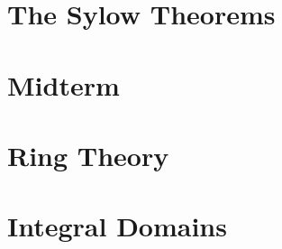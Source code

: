 \documentclass{bookneue}
\begin{document}
\vfill\pagebreak



\vfill\pagebreak

\chapter{The Sylow Theorems}



\vfill\pagebreak



\vfill\pagebreak



\vfill\pagebreak



\vfill\pagebreak



\vfill\pagebreak

\chapter{Midterm}



\vfill\pagebreak



\chapter{Ring Theory}



\vfill\pagebreak



\vfill\pagebreak



\vfill\pagebreak



\vfill\pagebreak



\vfill\pagebreak



\vfill\pagebreak

\chapter{Integral Domains}
\end{document}
